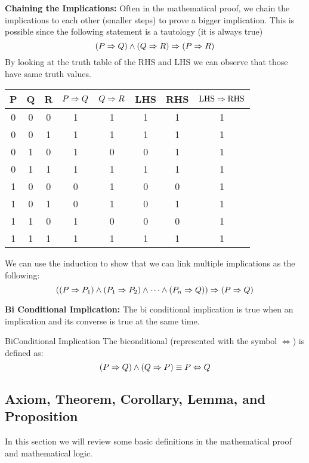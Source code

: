 \textbf{Chaining the Implications:} Often in the mathematical proof, we chain the implications to each other (smaller steps) to prove a bigger implication. This is possible since the following statement is a tautology (it is always true)
\[  (P \Rightarrow Q) \wedge (Q \Rightarrow R) \Rightarrow (P \Rightarrow R)  \]
By looking at the truth table of the RHS and LHS we can observe that those have same truth values.
\begin{center}
	\begin{tabular}{|c|c|c|c|c|c|c|c|}
		\hline
		P & Q & R & $ P \Rightarrow Q $ & $ Q \Rightarrow R $ & LHS & RHS & $ \text{LHS} \Rightarrow \text{RHS} $ \\
		\hline
		0 & 0 & 0 & 1 & 1 & 1 & 1 & 1 \\
		\hline
		0 & 0 & 1 & 1 & 1 & 1 & 1 & 1 \\
		\hline
		0 & 1 & 0 & 1 & 0 & 0 & 1 & 1 \\
		\hline
		0 & 1 & 1 & 1 & 1 & 1 & 1 & 1 \\
		\hline
		1 & 0 & 0 & 0 & 1 & 0 & 0 & 1 \\
		\hline
		1 & 0 & 1 & 0 & 1 & 0 & 1 & 1 \\
		\hline
		1 & 1 & 0 & 1 & 0 & 0 & 0 & 1 \\
		\hline
		1 & 1 & 1 & 1 & 1 & 1 & 1 & 1 \\
		\hline
	\end{tabular}
\end{center} 
We can use the induction to show that we can link multiple implications as the following:
\[ ((P \Rightarrow P_1) \wedge (P_1 \Rightarrow P_2) \wedge \cdots \wedge (P_n \Rightarrow Q)) \Rightarrow (P \Rightarrow Q) \]


\textbf{Bi Conditional Implication:} The bi conditional implication is true when an implication and its converse is true at the same time.

\begin{defbox}{BiConditional Implication}
	The biconditional (represented with the symbol $\Leftrightarrow$) is defined as:
	\[ (P \Rightarrow Q) \wedge (Q \Rightarrow P) \equiv P \Leftrightarrow Q \]
\end{defbox}


	


\subsection{Axiom, Theorem, Corollary, Lemma, and Proposition }

In this section we will review some basic definitions in the mathematical proof and mathematical logic.

